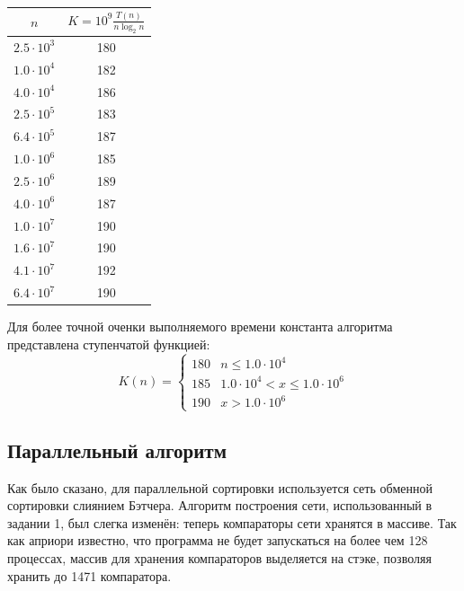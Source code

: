 \documentclass[14pt]{extarticle}
\begin{document}
\begin{table}[H]
\centering
\begin{tabular}{ | c | c | }
	\hline
	$n$ & $K=10^9 \frac{T(n)} {n \log_2 n}$ \\
	\hline
	$2.5 \cdot 10^3$ & 180 \\
	$1.0 \cdot 10^4$ & 182 \\
	$4.0 \cdot 10^4$ & 186 \\
	$2.5 \cdot 10^5$ & 183 \\
	$6.4 \cdot 10^5$ & 187 \\
	$1.0 \cdot 10^6$ & 185 \\
	$2.5 \cdot 10^6$ & 189 \\
	$4.0 \cdot 10^6$ & 187 \\
	$1.0 \cdot 10^7$ & 190 \\
	$1.6 \cdot 10^7$ & 190 \\
	$4.1 \cdot 10^7$ & 192 \\
	$6.4 \cdot 10^7$ & 190 \\
	\hline
\end{tabular}
\end{table}

Для более точной оченки выполняемого времени константа алгоритма представлена ступенчатой функцией:
\[ K(n) = \begin{cases} 
      180 & n \leq 1.0 \cdot 10^4 \\
      185 & 1.0 \cdot 10^4 < x \leq 1.0 \cdot 10^6 \\
      190 & x > 1.0 \cdot 10^6
   \end{cases}
\]

\subsection{Параллельный алгоритм}
Как было сказано, для параллельной сортировки используется сеть обменной сортировки слиянием Бэтчера. Алгоритм построения сети, использованный в задании 1, был слегка изменён: теперь компараторы сети хранятся в массиве. Так как априори известно, что программа не будет запускаться на более чем 128 процессах, массив для хранения компараторов выделяется на стэке, позволяя хранить до 1471 компаратора.
\end{document}
